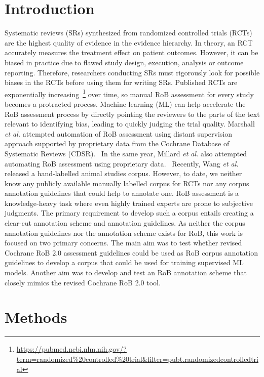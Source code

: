 \documentclass{IOS-Book-Article}
\begin{document}
\section{Introduction}
Systematic reviews (SRs) synthesized from randomized controlled trials (RCTs) are the highest quality of evidence in the evidence hierarchy.
In theory, an RCT accurately measures the treatment effect on patient outcomes.
However, it can be biased in practice due to flawed study design, execution, analysis or outcome reporting.
Therefore, researchers conducting SRs must rigorously look for possible biases in the RCTs before using them for writing SRs.
Published RCTs are exponentially increasing~\footnote{\url{https://pubmed.ncbi.nlm.nih.gov/?term=randomized\%20controlled\%20trial&filter=pubt.randomizedcontrolledtrial}} over time, so manual RoB assessment for every study becomes a protracted process.
Machine learning (ML) can help accelerate the RoB assessment process by directly pointing the reviewers to the parts of the text relevant to identifying bias, leading to quickly judging the trial quality.
Marshall \textit{et al.} attempted automation of RoB assessment using distant supervision approach supported by proprietary data from the Cochrane Database of Systematic Reviews (CDSR).~\cite{marshall2015automating}
In the same year, Millard \textit{et al.} also attempted automating RoB assessment using proprietary data.~\cite{millard2016machine}
Recently, Wang \textit{et al.} released a hand-labelled animal studies corpus\cite{wang2022risk}.
However, to date, we neither know any publicly available manually labelled corpus for RCTs nor any corpus annotation guidelines that could help to annotate one.
RoB assessment is a knowledge-heavy task where even highly trained experts are prone to subjective judgments.
The primary requirement to develop such a corpus entails creating a clear-cut annotation scheme and annotation guidelines.
As neither the corpus annotation guidelines nor the annotation scheme exists for RoB, this work is focused on two primary concerns.
The main aim was to test whether revised Cochrane RoB 2.0 assessment guidelines could be used as RoB corpus annotation guidelines to develop a corpus that could be used for training supervised ML models.
Another aim was to develop and test an RoB annotation scheme that closely mimics the revised Cochrane RoB 2.0 tool.~\cite{sterne2019rob}

\section{Methods}
\end{document}
